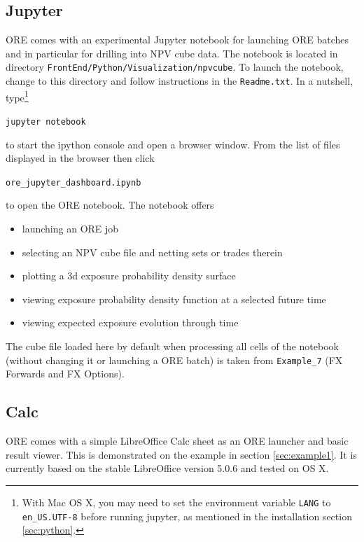 \documentclass[12pt, a4paper]{article}
\begin{document}
\subsection{Jupyter}\label{sec:jupyter}

ORE comes with an experimental Jupyter notebook for launching ORE batches and in particular for drilling into NPV cube
data.  The notebook is located in directory {\tt FrontEnd/Python/Visualization/npvcube}. To launch the notebook, change
to this directory and follow instructions in the {\tt Readme.txt}. In a nutshell, type\footnote{With Mac OS X, you may
  need to set the environment variable {\tt LANG} to {\tt en\_US.UTF-8} before running jupyter, as mentioned in the
  installation section \ref{sec:python}.}

\medskip
\centerline{\tt jupyter notebook}
\medskip

to start the ipython console and open a browser window. From the list of files displayed in the browser then click

\medskip
\centerline{\tt ore\_jupyter\_dashboard.ipynb} 
\medskip

to open the ORE notebook. The notebook offers
\begin{itemize}
\item launching an ORE job
\item selecting an NPV cube file and netting sets or trades therein
\item plotting a 3d exposure probability density surface
\item viewing exposure probability density function at a selected future time
\item viewing expected exposure evolution through time  
\end{itemize}

The cube file loaded here by default when processing all cells of the notebook (without changing it or launching a ORE
batch) is taken from {\tt Example\_7} (FX Forwards and FX Options).


\subsection{Calc}\label{sec:calc}

ORE comes with a simple LibreOffice Calc \cite{LO} sheet as an ORE launcher and basic result viewer. This is
demonstrated on the example in section \ref{sec:example1}. It is currently based on the stable LibreOffice version 5.0.6
and tested on OS X. \\
\end{document}
